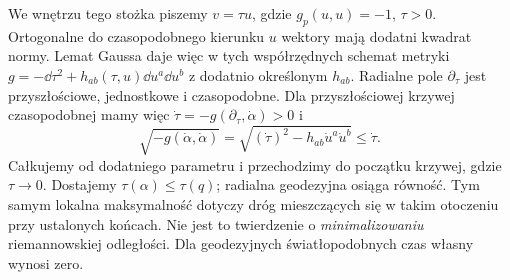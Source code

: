 We wnętrzu tego stożka
piszemy $v=\tau u$, gdzie $g_p(u,u)=-1$,
$\tau>0$. Ortogonalne do czasopodobnego
kierunku $u$ wektory mają dodatni kwadrat
normy. Lemat Gaussa daje więc w tych
współrzędnych schemat metryki
$g=-\dd\tau^2+h_{ab}(\tau,u)\dd u^a\dd u^b$
z dodatnio określonym $h_{ab}$.
Radialne pole $\partial_\tau$ jest przyszłościowe,
jednostkowe i czasopodobne. Dla przyszłościowej krzywej
czasopodobnej mamy więc $\dot\tau=-g(\partial_\tau,\dot\alpha)>0$ i
\[
 \sqrt{-g(\dot\alpha,\dot\alpha)}
 =\sqrt{(\dot\tau)^2-h_{ab}\dot u^a\dot u^b}
 \leq\dot\tau.
\]
Całkujemy od dodatniego parametru i przechodzimy do początku
krzywej, gdzie $\tau\to0$. Dostajemy $\tau(\alpha)
\leq\tau(q)$; radialna geodezyjna osiąga
równość. Tym samym lokalna maksymalność
dotyczy dróg mieszczących się w takim
otoczeniu przy ustalonych końcach.
Nie jest to twierdzenie o \emph{minimalizowaniu}
riemannowskiej odległości. Dla geodezyjnych
światłopodobnych czas własny wynosi zero.

